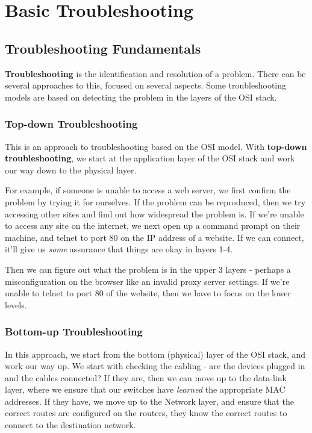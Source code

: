 \chapter{Basic Troubleshooting}
\section{Troubleshooting Fundamentals}
\textbf{Troubleshooting} is the identification and resolution of a problem. There can be several approaches to this, focused on several aspects. Some troubleshooting models are based on detecting the problem in the layers of the OSI stack. 
 
\subsection{Top-down Troubleshooting}
This is an approach to troubleshooting based on the OSI model. With \textbf{top-down troubleshooting}, we start at the application layer of the OSI stack and work our way down to the physical layer.

For example, if someone is unable to access a web server, we first confirm the problem by trying it for ourselves. If the problem can be reproduced, then we try accessing other sites and find out how widespread the problem is. If we're unable to access any site on the internet, we next open up a command prompt on their machine, and telnet to port 80 on the IP address of a website. If we can connect, it'll give us \textit{some} assurance that things are okay in layers 1-4.

Then we can figure out what the problem is in the upper 3 layers - perhaps a misconfiguration on the browser like an invalid proxy server settings. If we're unable to telnet to port 80 of the website, then we have to focus on the lower levels. 

\subsection{Bottom-up Troubleshooting}
In this approach, we start from the bottom (physical) layer of the OSI stack, and work our way up. We start with checking the cabling - are the devices plugged in and the cables connected? If they are, then we can move up to the data-link layer, where we ensure that our switches have \textit{learned} the appropriate MAC addresses. If they have, we move up to the Network layer, and ensure that the correct routes are configured on the routers, they know the correct routes to connect to the destination network. 

